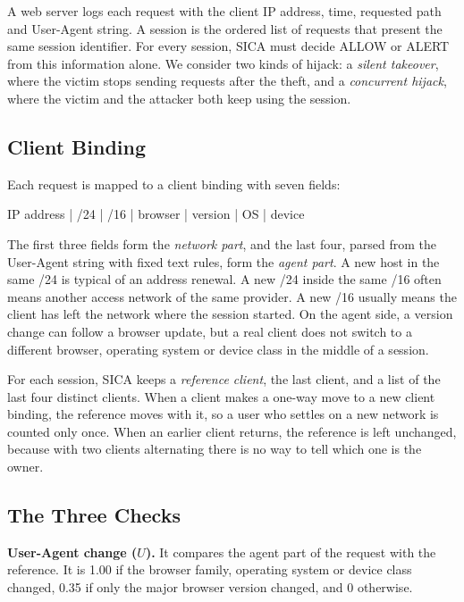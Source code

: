 \documentclass[conference]{IEEEtran}
\begin{document}
A web server logs each request with the client IP address, time, requested path
and User-Agent string. A session is the ordered list of requests that present
the same session identifier. For every session, SICA must decide ALLOW or ALERT
from this information alone. We consider two kinds of hijack: a \emph{silent
takeover}, where the victim stops sending requests after the theft, and a
\emph{concurrent hijack}, where the victim and the attacker both keep using the
session.

\subsection{Client Binding}

Each request is mapped to a client binding with seven fields:
\begin{center}
IP address \;|\; /24 \;|\; /16 \;|\; browser \;|\; version \;|\; OS \;|\; device
\end{center}
The first three fields form the \emph{network part}, and the last four, parsed
from the User-Agent string with fixed text rules, form the \emph{agent part}. A
new host in the same /24 is typical of an address renewal. A new /24 inside the
same /16 often means another access network of the same provider. A new /16
usually means the client has left the network where the session started. On the
agent side, a version change can follow a browser update, but a real client
does not switch to a different browser, operating system or device class in the
middle of a session.

For each session, SICA keeps a \emph{reference client}, the last client, and a
list of the last four distinct clients. When a client makes a one-way move to a
new client binding, the reference moves with it, so a user who settles on a new
network is counted only once. When an earlier client returns, the reference is
left unchanged, because with two clients alternating there is no way to tell
which one is the owner.

\subsection{The Three Checks}

\textbf{User-Agent change ($U$).} It compares the agent part of the request with
the reference. It is 1.00 if the browser family, operating system or device
class changed, 0.35 if only the major browser version changed, and 0 otherwise.
\end{document}
